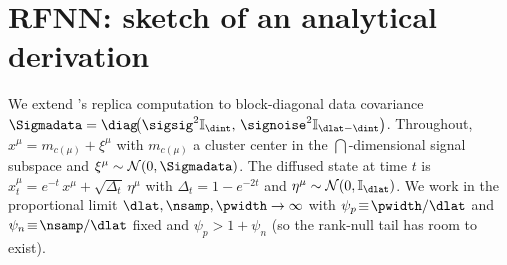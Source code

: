 %

\section{RFNN: sketch of an analytical derivation}
\label{app:proof-sketch}

We extend \citeauthor{bonnaire2025}'s replica computation to
block-diagonal data covariance
\(\Sigmadata = \diag\!\bigl(\sigsig^2\mathbb{I}_{\dint},\,
                           \signoise^2\mathbb{I}_{\dlat - \dint}\bigr)\).
Throughout, $x^\mu = m_{c(\mu)} + \xi^\mu$ with $m_{c(\mu)}$ a cluster
center in the $\dint$-dimensional signal subspace and
$\xi^\mu \sim \mathcal{N}(0, \Sigmadata)$. The diffused state at time
$t$ is $x_t^\mu = e^{-t}\,x^\mu + \sqrt{\Delta_t}\,\eta^\mu$ with
$\Delta_t = 1 - e^{-2t}$ and $\eta^\mu \sim \mathcal{N}(0, \mathbb{I}_{\dlat})$.
We work in the proportional limit $\dlat,\nsamp,\pwidth\to\infty$ with
$\psi_p\!\equiv\!\pwidth/\dlat$ and $\psi_n\!\equiv\!\nsamp/\dlat$ fixed
and $\psi_p > 1 + \psi_n$ (so the rank-null tail has room to exist).

